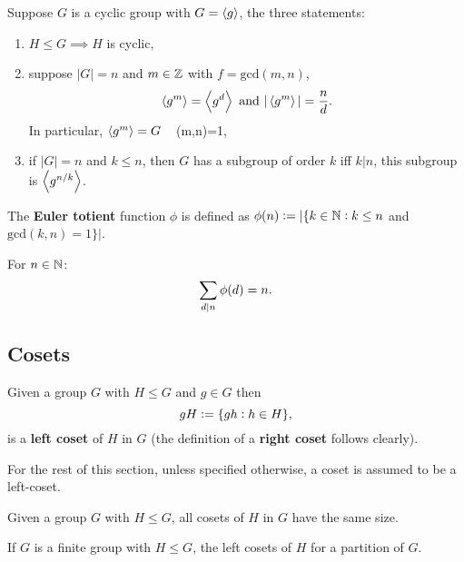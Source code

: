 \begin{theorem}
    Suppose  $G$ is a cyclic group with $G = \left\langle g \right\rangle$, the three statements: \begin{enumerate}
        \item $H\leq G \implies H$ is cyclic,
        \item suppose $|G| = n$ and $m\in\mathbb{Z}$ with $f=\text{gcd}(m,n)$, \[
            \abr{g^m} = \abr{g^d} \ \text{\textcolor{black}{ and }} |\abr{g^m}| = \frac{n}{d}
            \textcolor{black}{.}
        \] In particular, $\left\langle g^m \right\rangle = G$  \ \text{\textcolor{black}{ iff }} (m,n)=1,
        \item if $|G|=n$ and $k\leq n$, then $G$ has a subgroup of order $k$ iff $k|n$, this subgroup is $\left\langle g^{n/k} \right\rangle$.
    \end{enumerate}
\end{theorem}

\begin{definition}
    The \textbf{Euler totient} function $\phi$ is defined as $\phi(n):=|\{k\in\mathbb{N}: k\leq n$ and $\text{gcd}(k,n)=1\}|$.
\end{definition}

\begingroup\belowdisplayskip=-10pt
\begin{corollary}
    For $n\in\mathbb{N}$: \[
        \sum_{d|n}\phi(d) = n
        \textcolor{black}{.}
    \]
\end{corollary}
\endgroup

\subsection{Cosets}

\begin{definition}[Coset]
    Given a group $G$ with $H\leq G$ and $g\in G$ then \[
    gH := \{gh: h\in H\}
    \textcolor{black}{,}
    \]
    is a \textbf{left coset} of $H$ in $G$ (the definition of a \textbf{right coset} follows clearly).
\end{definition}

\begin{note}
    For the rest of this section, unless specified otherwise, a coset is assumed to be a left-coset.
\end{note}

\begin{theorem}
    Given a group $G$ with $H\leq G$, all cosets of $H$ in $G$ have the same size.
\end{theorem}

\begin{theorem}
    If $G$ is a finite group with $H\leq G$, the left cosets of $H$ for a partition of $G$.
\end{theorem}

